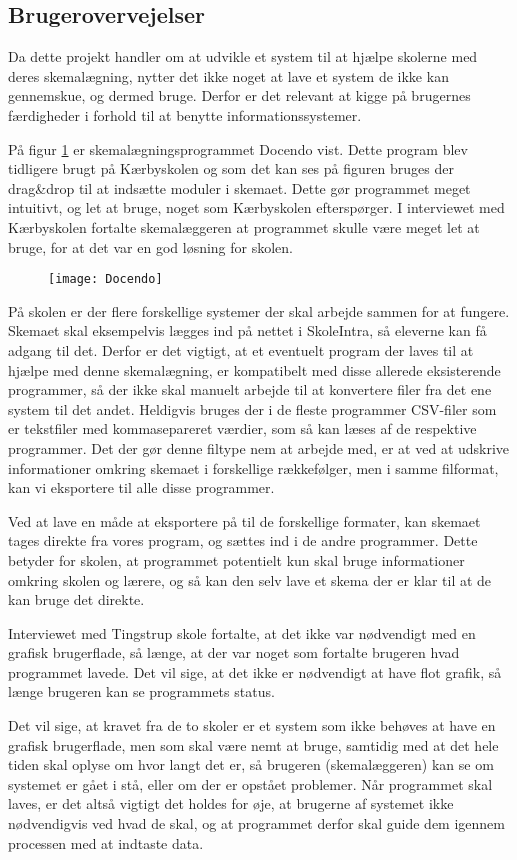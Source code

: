 \subsection{Brugerovervejelser}
Da dette projekt handler om at udvikle et system til at hjælpe skolerne med deres skemalægning, nytter det ikke noget at lave et system de ikke kan gennemskue, og dermed bruge. Derfor er det relevant at kigge på brugernes færdigheder i forhold til at benytte informationssystemer.

På figur \ref{fig:docendo_skema} er skemalægningsprogrammet Docendo vist. Dette program blev tidligere brugt på Kærbyskolen og som det kan ses på figuren bruges der drag\&drop til at indsætte moduler i skemaet. Dette gør programmet meget intuitivt, og let at bruge, noget som Kærbyskolen efterspørger. I interviewet med Kærbyskolen fortalte skemalæggeren at programmet skulle være meget let at bruge, for at det var en god løsning for skolen.

\begin{figure}[h!]
	\centering
	\texttt{[image: Docendo]}
	\label{fig:docendo_skema}
\end{figure}

På skolen er der flere forskellige systemer der skal arbejde sammen for at fungere. Skemaet skal eksempelvis lægges ind på nettet i SkoleIntra, så eleverne kan få adgang til det. Derfor er det vigtigt, at et eventuelt program der laves til at hjælpe med denne skemalægning, er kompatibelt med disse allerede eksisterende programmer, så der ikke skal manuelt arbejde til at konvertere filer fra det ene system til det andet. Heldigvis bruges der i de fleste programmer CSV-filer som er tekstfiler med kommasepareret værdier, som så kan læses af de respektive programmer. Det der gør denne filtype nem at arbejde med, er at ved at udskrive informationer omkring skemaet i forskellige rækkefølger, men i samme filformat, kan vi eksportere til alle disse programmer.

Ved at lave en måde at eksportere på til de forskellige formater, kan skemaet tages direkte fra vores program, og sættes ind i de andre programmer. Dette betyder for skolen, at programmet potentielt kun skal bruge informationer omkring skolen og lærere, og så kan den selv lave et skema der er klar til at de kan bruge det direkte.

Interviewet med Tingstrup skole fortalte, at det ikke var nødvendigt med en grafisk brugerflade, så længe, at der var noget som fortalte brugeren hvad programmet lavede. Det vil sige, at det ikke er nødvendigt at have flot grafik, så længe brugeren kan se programmets status. 

Det vil sige, at kravet fra de to skoler er et system som ikke behøves at have en grafisk brugerflade, men som skal være nemt at bruge, samtidig med at det hele tiden skal oplyse om hvor langt det er, så brugeren (skemalæggeren) kan se om systemet er gået i stå, eller om der er opstået problemer. Når programmet skal laves, er det altså vigtigt det holdes for øje, at brugerne af systemet ikke nødvendigvis ved hvad de skal, og at programmet derfor skal guide dem igennem processen med at indtaste data.